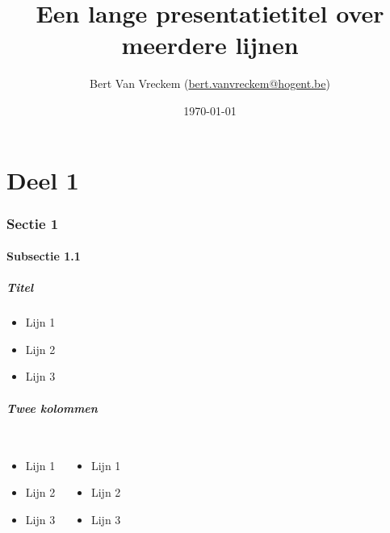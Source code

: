 \documentclass{beamer}
\title[Korte titel]{Een lange presentatietitel over meerdere lijnen}
\author{Bert {Van Vreckem} \small(\href{mailto:bert.vanvreckem@hogent.be}{bert.vanvreckem@hogent.be})}
\date{\today}
\begin{document}

\HoGentLogo

\begin{frame}[plain]
  \titlepage
\end{frame}


\part{Deel 1}

\section{Sectie 1}

\subsection{Subsectie 1.1}

\begin{frame}
  \frametitle{Titel}

  \begin{itemize}
  \item Lijn 1
  \item Lijn 2
  \item Lijn 3
  \end{itemize}
\end{frame}

\begin{frame}
  \frametitle{Twee kolommen}

  \begin{columns}[c]

    \begin{itemize}
    \item Lijn 1
    \item Lijn 2
    \item Lijn 3
    \end{itemize}

    \begin{itemize}
    \item Lijn 1
    \item Lijn 2
    \item Lijn 3
    \end{itemize}

  \end{columns}
\end{frame}
\end{document}
